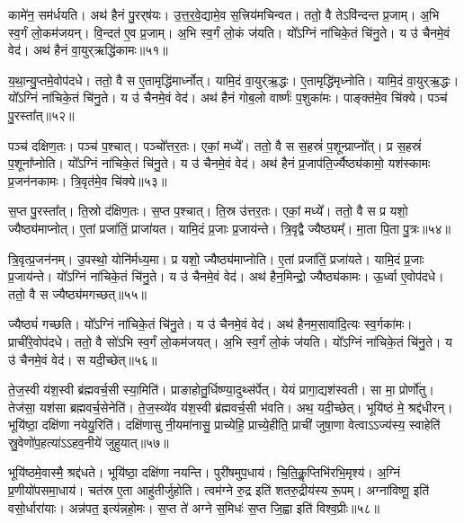    कामे॑न॒ सम॑र्धयति।
   अथ॑ हैनं पु॒रर्{‌}ष॑यः।
   उ॒त्त॒र॒वे॒द्यामे॒व स॒त्त्रिय॑मचिन्वत।
   ततो॒ वै तेऽवि॑न्दन्त प्र॒जाम्।
   अ॒भि स्व॒र्गं लो॒कम॑जयन्।
   वि॒न्दत॑ ए॒व प्र॒जाम्।
   अ॒भि स्व॒र्गं लो॒कं ज॑यति।
   यो᳚ऽग्निं ना॑चिके॒तं चि॑नु॒ते।
   य उ॑ चैनमे॒वं वेद॑।
   अथ॑ हैनं वा॒युर्{‌}ऋद्धि॑कामः॥५१॥

   य॒था॒न्यु॒प्तमे॒वोप॑दधे।
   ततो॒ वै स ए॒तामृद्धि॑मार्ध्नोत्।
   यामि॒दं वा॒युर्{‌}ऋ॒द्धः।
   ए॒तामृद्धि॑मृध्नोति।
   यामि॒दं वा॒युर्{‌}ऋ॒द्धः।
   यो᳚ऽग्निं ना॑चिके॒तं चि॑नु॒ते।
   य उ॑ चैनमे॒वं वेद॑।
   अथ॑ हैनं गोब॒लो वार्ष्णः॑ प॒शुका॑मः।
   पाङ्क्त॑मे॒व चि॑क्ये।
   पञ्च॑ पु॒रस्ता᳚त्॥५२॥

   पञ्च॑ दक्षिण॒तः।
   पञ्च॑ प॒श्चात्।
   पञ्चो᳚त्तर॒तः।
   एकां॒ मध्ये᳚।
   ततो॒ वै स स॒हस्रं॑ प॒शून्प्राप्नो᳚त्।
   प्र स॒हस्रं॑ प॒शूना᳚प्नोति।
   यो᳚ऽग्निं ना॑चिके॒तं चि॑नु॒ते।
   य उ॑ चैनमे॒वं वेद॑।
   अथ॑ हैनं प्र॒जाप॑ति॒र्ज्यैष्ठ्य॑कामो॒ यश॑स्कामः प्र॒जन॑नकामः।
   त्रि॒वृत॑मे॒व चि॑क्ये॥५३॥

   स॒प्त पु॒रस्ता᳚त्।
   ति॒स्रो द॑क्षिण॒तः।
   स॒प्त प॒श्चात्।
   ति॒स्र उ॑त्तर॒तः।
   एकां॒ मध्ये᳚।
   ततो॒ वै स प्र यशो॒ ज्यैष्ठ्य॑माप्नोत्।
   ए॒तां प्रजा॑तिं॒ प्राजा॑यत।
   यामि॒दं प्र॒जाः प्र॒जाय॑न्ते।
   त्रि॒वृद्वै ज्यैष्ठ्यम्᳚।
   मा॒ता पि॒ता पु॒त्रः॥५४॥

   त्रि॒वृत्प्र॒जन॑नम्।
   उ॒पस्थो॒ योनि॑र्मध्य॒मा।
   प्र यशो॒ ज्यैष्ठ्य॑माप्नोति।
   ए॒तां प्रजा॑तिं॒ प्रजा॑यते।
   यामि॒दं प्र॒जाः प्र॒जाय॑न्ते।
   यो᳚ऽग्निं ना॑चिके॒तं चि॑नु॒ते।
   य उ॑ चैनमे॒वं वेद॑।
   अथ॑ हैन॒मिन्द्रो॒ ज्यैष्ठ्य॑कामः।
   ऊ॒र्ध्वा ए॒वोप॑दधे।
   ततो॒ वै स ज्यैष्ठ्य॑मगच्छत्॥५५॥

   ज्यैष्ठ्यं॑ गच्छति।
   यो᳚ऽग्निं ना॑चिके॒तं चि॑नु॒ते।
   य उ॑ चैनमे॒वं वेद॑।
   अथ॑ हैनम॒सावा॑दि॒त्यः स्व॒र्गका॑मः।
   प्राची॑रे॒वोप॑दधे।
   ततो॒ वै सो॑ऽभि स्व॒र्गं लो॒कम॑जयत्।
   अ॒भि स्व॒र्गं लो॒कं ज॑यति।
   यो᳚ऽग्निं ना॑चिके॒तं चि॑नु॒ते।
   य उ॑ चैनमे॒वं वेद॑।
   स यदी॒च्छेत्॥५६॥

   ते॒ज॒स्वी य॑श॒स्वी ब्र॑ह्मवर्च॒सी स्या॒मिति॑।
   प्राङाहोतु॒र्धिष्ण्या॒\-दुथ्स॑र्पेत्।
   येयं प्रागा॒द्यश॑स्वती।
   सा मा॒ प्रोर्णो॑तु।
   तेज॑सा॒ यश॑सा ब्रह्मवर्च॒सेनेति॑।
   ते॒ज॒स्व्ये॑व य॑श॒स्वी ब्र॑ह्मवर्च॒सी भ॑वति।
   अथ॒ यदी॒च्छेत्।
   भूयि॑ष्ठं मे॒ श्रद्द॑धीरन्।
   भूयि॑ष्ठा॒ दक्षि॑णा नयेयु॒रिति॑।
   दक्षि॑णासु नी॒यमा॑नासु॒ प्राच्येहि॒ प्राच्ये॒हीति॒ प्राची॑ जुषा॒णा वेत्वाऽऽज्य॑स्य॒ स्वाहेति॑ स्रु॒वेणो॑प॒हत्या॑ऽऽहव॒नीये॑ जुहुयात्॥५७॥

   भूयि॑ष्ठमे॒वास्मै॒ श्रद्द॑धते।
   भूयि॑ष्ठा॒ दक्षि॑णा नयन्ति।
   पुरी॑षमुप॒धाय॑।
   चि॒ति॒कॢ॒प्तिभि॑रभि॒मृश्य॑।
   अ॒ग्निं प्र॒णीयो॑प\-समा॒धाय॑।
   चत॑स्र ए॒ता आहु॑तीर्जुहोति।
   त्वम॑ग्ने रु॒द्र इति॑ शतरु॒द्रीय॑स्य रू॒पम्।
   अग्ना॑विष्णू॒ इति॑ वसो॒र्धारा॑याः।
   अन्न॑पत॒ इत्य॑न्नहो॒मः।
   स॒प्त ते॑ अग्ने स॒मिधः॑ स॒प्त जि॒ह्वा इति॑ विश्व॒प्रीः॥५८॥
\anuvakamend
  
